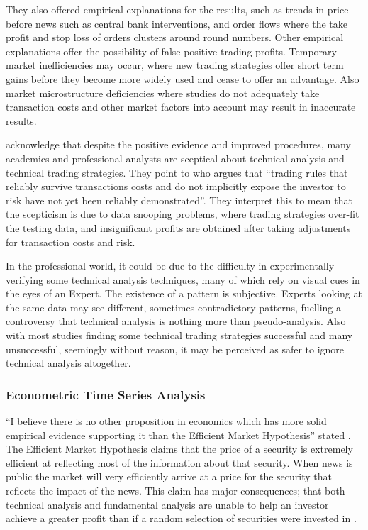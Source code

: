 \documentclass{article}
\theoremstyle{definition}
\begin{document}
They also offered empirical explanations for the results, such as trends in price before news such as central bank interventions, and order flows where the take profit and stop loss of orders clusters around round numbers. Other empirical explanations offer the possibility of false positive trading profits. Temporary market inefficiencies may occur, where new trading strategies offer short term gains before they become more widely used and cease to offer an advantage. Also market microstructure deficiencies where studies do not adequately take transaction costs and other market factors into account may result in inaccurate results. 

\cite{taprofitability} acknowledge that despite the positive evidence and improved procedures, many academics and professional analysts are sceptical about technical analysis and technical trading strategies. They point to \cite{assetpricing} who argues that ``trading rules that reliably survive transactions costs and do not implicitly expose the investor to risk have not yet been reliably demonstrated''. They interpret this to mean that the scepticism is due to data snooping problems, where trading strategies over-fit the testing data, and insignificant profits are obtained after taking adjustments for transaction costs and risk.

In the professional world, it could be due to the difficulty in experimentally verifying some technical analysis techniques, many of which rely on visual cues in the eyes of an Expert. The existence of a pattern is subjective. Experts looking at the same data may see different, sometimes contradictory patterns, fuelling a controversy that technical analysis is nothing more than pseudo-analysis. Also with most studies finding some technical trading strategies successful and many unsuccessful, seemingly without reason, it may be perceived as safer to ignore technical analysis altogether.

\subsubsection{Econometric Time Series Analysis}
\label{emh}
``I believe there is no other proposition in economics which has more solid empirical evidence supporting it than the Efficient Market Hypothesis'' stated \cite{jensen1978some}. The Efficient Market Hypothesis claims that the price of a security is extremely efficient at reflecting most of the information about that security. When news is public the market will very efficiently arrive at a price for the security that reflects the impact of the news. This claim has major consequences; that both technical analysis and fundamental analysis are unable to help an investor achieve a greater profit than if a random selection of securities were invested in \citep{emhAndCritics}. 
\end{document}
